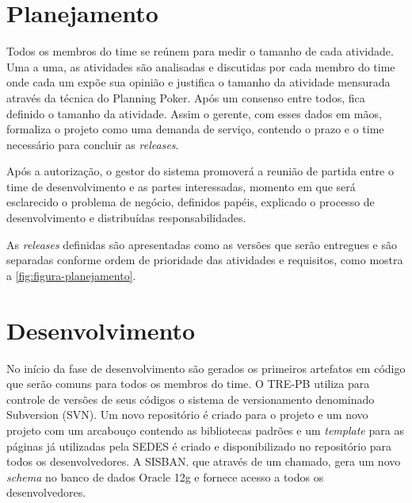 \section{Planejamento}
\label{sec:atividadesRealizadasPlanejamento}

Todos os membros do time se reúnem para medir o tamanho de cada atividade. Uma a uma, as atividades são analisadas e discutidas por cada membro do time onde cada um expõe sua opinião e justifica o tamanho da atividade mensurada através da técnica do Planning Poker. Após um consenso entre todos, fica definido o tamanho da atividade. Assim o gerente, com esses dados em mãos, formaliza o projeto como uma demanda de serviço, contendo o prazo e o time necessário para concluir as \textit{releases}.

\begin{citacao}
Após a autorização, o gestor do sistema promoverá a reunião de
partida entre o time de desenvolvimento e as partes interessadas, momento em que será
esclarecido o problema de negócio, definidos papéis, explicado o processo de
desenvolvimento e distribuídas responsabilidades.\cite[p.~2]{Portaria37:2017}
\end{citacao}

As \textit{releases} definidas são apresentadas como as versões que serão entregues e são separadas conforme ordem de prioridade das atividades e requisitos, como mostra a \autoref{fig:figura-planejamento}.



\section{Desenvolvimento}
\label{sec:atividadesRealizadasDesenvolvimento}

No início da fase de desenvolvimento são gerados os primeiros artefatos em código que serão comuns para todos os membros do time. O TRE-PB utiliza para controle de versões de seus códigos o sistema de versionamento denominado Subversion (SVN). Um novo repositório é criado para o projeto e um novo projeto com um arcabouço contendo as bibliotecas padrões e um \textit{template} para as páginas já utilizadas pela SEDES é criado e disponibilizado no repositório para todos os desenvolvedores. A SISBAN. que através de um chamado, gera um novo \textit{schema} no banco de dados Oracle 12g e fornece acesso a todos os desenvolvedores.

